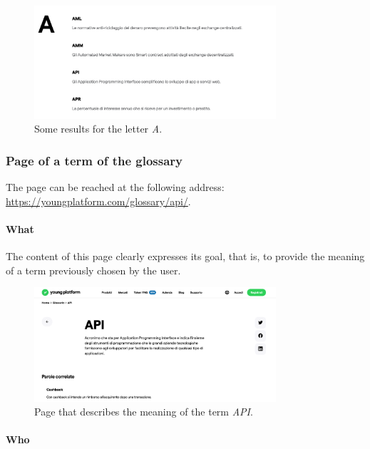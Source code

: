 \begin{figure}[H]
  \centering
  \includegraphics[width=0.80\textwidth]{res/images/internal-pages/glossary/glossary-3.png}
  \caption{Some results for the letter \textit{A}.}
  \label{fig:glossary-3}
\end{figure}

\subsubsection{Page of a term of the glossary}

The page can be reached at the following address: 
\href{https://youngplatform.com/glossary/api/}{https://youngplatform.com/glossary/api/}.

\paragraph{What}

The content of this page clearly expresses its goal, that is, to provide 
the meaning of a term previously chosen by the user.

\begin{figure}[H]
  \centering
  \includegraphics[width=0.80\textwidth]{res/images/internal-pages/glossary/glossary-4.png}
  \caption{Page that describes the meaning of the term \textit{API}.}
  \label{fig:glossary-4}
\end{figure}

\paragraph{Who}

